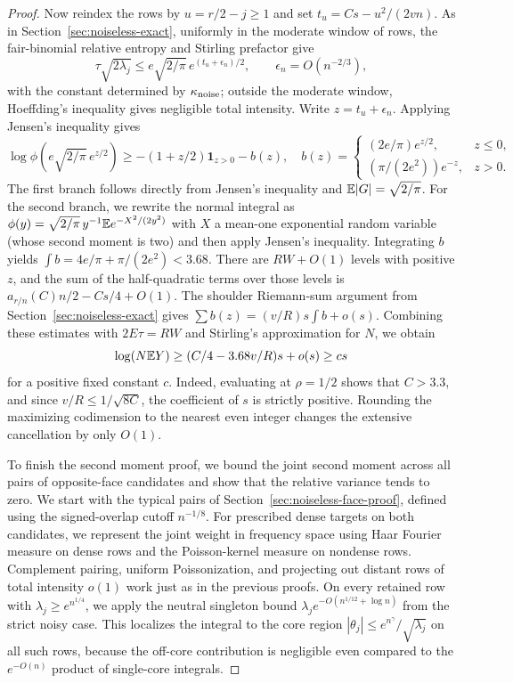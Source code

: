 \begin{proof}
Now reindex the rows by \(u=r/2-j\ge1\) and set \(t_u=Cs-u^2/(2vn)\).
As in Section~\ref{sec:noiseless-exact}, uniformly in the moderate window of
rows, the fair-binomial relative entropy and Stirling prefactor give
\[
 \tau\sqrt{2\lambda_j}
 \le e\sqrt{2/\pi}\,e^{(t_u+\epsilon_n)/2},
 \qquad \epsilon_n=O(n^{-2/3}),
\]
with the constant determined by \(\kappa_{\rm noise}\); outside the moderate
window, Hoeffding's inequality gives negligible total intensity.
Write \(z=t_u+\epsilon_n\). Applying Jensen's inequality gives
\[
 \log\phi(e\sqrt{2/\pi}\,e^{z/2})
 \ge -(1+z/2)\mathbf1_{z>0}-b(z),
 \quad
 b(z)=
 \begin{cases}
 (2e/\pi)e^{z/2},&z\le0,\\
 (\pi/(2e^2))e^{-z},&z>0.
 \end{cases}
\]
The first branch follows directly from Jensen's inequality and
\(\mathbb E |G|=\sqrt{2/\pi}\). For the second branch, we rewrite the normal
integral as \(\phi(y)=\sqrt{2/\pi}\,y^{-1}\mathbb E e^{-X^2/(2y^2)}\) with \(X\) a
mean-one exponential random variable (whose second moment is two) and then
apply Jensen's inequality. Integrating \(b\) yields
\(\int b=4e/\pi+\pi/(2e^2)<3.68\). There are \(RW+O(1)\) levels with positive
\(z\), and the sum of the half-quadratic terms over those levels is
\(a_{r/n}(C)n/2-Cs/4+O(1)\). The shoulder Riemann-sum argument from
Section~\ref{sec:noiseless-exact} gives
\(\sum b(z)=(v/R)s\int b+o(s)\). Combining these estimates with \(2E\tau=RW\)
and Stirling's approximation for \(N\), we obtain
\[
 \log(N\mathbb E Y)\ge (C/4-3.68v/R)s+o(s)\ge cs
\]
for a positive fixed constant \(c\). Indeed, evaluating at \(\rho=1/2\) shows
that \(C>3.3\), and since \(v/R\le1/\sqrt{8C}\), the coefficient of \(s\) is
strictly positive. Rounding the maximizing codimension to the nearest even
integer changes the extensive cancellation by only \(O(1)\).

To finish the second moment proof, we bound the joint second moment across all
pairs of opposite-face candidates and show that the relative variance tends to
zero. We start with the typical pairs of
Section~\ref{sec:noiseless-face-proof}, defined using the signed-overlap cutoff
\(n^{-1/8}\). For prescribed dense targets on both candidates, we represent the
joint weight in frequency space using Haar Fourier measure on dense rows and
the Poisson-kernel measure on nondense rows. Complement pairing, uniform
Poissonization, and projecting out distant rows of total intensity \(o(1)\)
work just as in the previous proofs. On every retained row with
\(\lambda_j\ge e^{n^{1/4}}\), we apply the neutral singleton bound
\(\lambda_j e^{-O(n^{1/12}+\log n)}\) from the strict noisy case. This
localizes the integral to the core region
\(|\theta_j|\le e^{n^\gamma}/\sqrt{\lambda_j}\) on all such rows, because the
off-core contribution is negligible even compared to the \(e^{-O(n)}\) product
of single-core integrals.


\end{proof}
